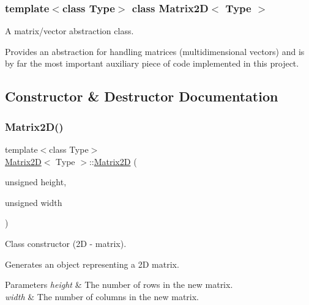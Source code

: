 \subsubsection*{template$<$class Type$>$\newline
class Matrix2\+D$<$ Type $>$}

A matrix/vector abstraction class. 

Provides an abstraction for handling matrices (multidimensional vectors) and is by far the most important auxiliary piece of code implemented in this project. 

\subsection{Constructor \& Destructor Documentation}
\mbox{\label{classMatrix2D_a6166db3bae116e2f009721534abdb2de}} 
\subsubsection{\texorpdfstring{Matrix2\+D()}{Matrix2D()}\hspace{0.1cm}{\footnotesize\ttfamily [1/3]}}
{\footnotesize\ttfamily template$<$class Type$>$ \\
\mbox{\hyperlink{classMatrix2D}{Matrix2D}}$<$ Type $>$\+::\mbox{\hyperlink{classMatrix2D}{Matrix2D}} (\begin{DoxyParamCaption}\item[{unsigned}]{height,  }\item[{unsigned}]{width }\end{DoxyParamCaption})\hspace{0.3cm}{\ttfamily [inline]}}



Class constructor (2D -\/ matrix). 

Generates an object representing a 2D matrix. 
\begin{DoxyParams}{Parameters}
{\em height} & The number of rows in the new matrix. \\
\hline
{\em width} & The number of columns in the new matrix. \\
\hline
\end{DoxyParams}
\mbox{\label{classMatrix2D_aab23e73fe109ec1eb39dc442bcb67cbe}} 
